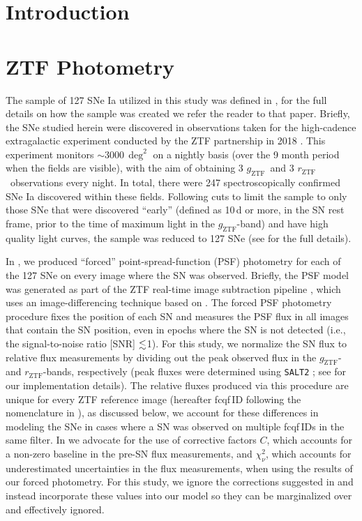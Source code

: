 \documentclass[twocolumn]{aastex63}
\newcommand{\rztf}{$r_\mathrm{ZTF}$}
\newcommand{\gztf}{$g_\mathrm{ZTF}$}
\begin{document}
\section{Introduction}

\section{ZTF Photometry}

The sample of 127 SNe Ia utilized in this study was defined in \citet{Yao19},
for the full details on how the sample was created we refer the reader to
that paper. Briefly, the SNe studied herein were discovered in observations
taken for the high-cadence extragalactic experiment conducted by the ZTF
partnership in 2018 \citep{Bellm19a}. This experiment monitors
$\sim$3000\,$\deg^2$ on a nightly basis (over the 9 month period when the
fields are visible), with the aim of obtaining 3 \gztf\ and 3 \rztf\
observations every night. In total, there were 247 spectroscopically
confirmed SNe Ia discovered within these fields. Following cuts to limit the
sample to only those SNe that were discovered ``early'' (defined as 10\,d or
more, in the SN rest frame, prior to the time of maximum light in the
\gztf-band) and have high quality light curves, the sample was reduced to 127
SNe (see \citealt{Yao19} for the full details).

In \citet{Yao19}, we produced ``forced'' point-spread-function (PSF)
photometry for each of the 127 SNe on every image where the SN was observed.
Briefly, the PSF model was generated as part of the ZTF real-time image
subtraction pipeline \citep{Masci19}, which uses an image-differencing
technique based on \citet{Zackay16}. The forced PSF photometry procedure
fixes the position of each SN and measures the PSF flux in all images that
contain the SN position, even in epochs where the SN is not detected (i.e.,
the signal-to-noise ratio [SNR] $\lesssim$1). For this study, we normalize the SN
flux to relative flux measurements by dividing out the peak observed flux in
the \gztf- and \rztf-bands, respectively (peak fluxes were determined using
\texttt{SALT2} \citealt{Guglielmo93}; see \citealt{Yao19} for our
implementation details). The relative fluxes produced via this procedure are
unique for every ZTF reference image (hereafter fcqf\,ID following the
nomenclature in \citealt{Yao19}), as discussed below, we account for these
differences in modeling the SNe in cases where a SN was observed on multiple
fcqf\,IDs in the same filter. In \citet{Yao19} we advocate for the use of
corrective factors $C$, which accounts for a non-zero baseline in the pre-SN
flux measurements, and $\chi^2_{\nu}$, which accounts for underestimated
uncertainties in the flux measurements, when using the results of our forced
photometry. For this study, we ignore the corrections suggested in
\citet{Yao19} and instead incorporate these values into our model so they can
be marginalized over and effectively ignored.
\end{document}
